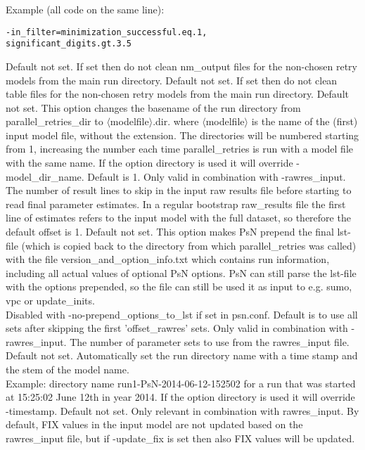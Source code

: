 \begin{optionlist}
Example (all code on the same line):
\begin{verbatim}
-in_filter=minimization_successful.eq.1,
significant_digits.gt.3.5
\end{verbatim}
\nextopt
{}
Default not set. If set then do not clean nm\_output files for the non-chosen retry models from the main run directory.
\nextopt
{}
Default not set. If set then do not clean table files for the non-chosen retry models from the main run directory.
\nextopt
{}
Default not set. This option changes the basename of the run directory from parallel\_retries\_dir to $\langle$modelfile$\rangle$.dir. where $\langle$modelfile$\rangle$ is the name of the (first) input model file, without the extension. The directories will be numbered starting from 1, increasing the number each time parallel\_retries is run with a model file with the same name. If the option directory is used it will override -model\_dir\_name.
\nextopt
{}
Default is 1. Only valid in combination with -rawres\_input. The number of result lines to skip in the input raw results file before starting to read final parameter estimates. In a regular bootstrap raw\_results file the first line of estimates refers to the input model with the full dataset, so therefore the default offset is 1.
\nextopt
{}
Default not set. This option makes PsN prepend the final lst-file (which is copied back to the directory from which parallel\_retries was called) with the file version\_and\_option\_info.txt which contains run information, including all actual values of optional PsN options. PsN can still parse the lst-file with the options prepended, so the file can still be used it as input to e.g. sumo, vpc or update\_inits.\\ Disabled with -no-prepend\_options\_to\_lst if set in psn.conf.
\nextopt
{}
Default is to use all sets after skipping the first 'offset\_rawres' sets. Only valid in combination with -rawres\_input. The number of parameter sets to use from the rawres\_input file. 
\nextopt
{}
Default not set. Automatically set the run directory name with a time stamp and the stem of the model name.\\
Example: directory name run1-PsN-2014-06-12-152502 for a run that was started at 15:25:02 June 12th in year 2014. If the option directory is used it will override -timestamp.
\nextopt
{}
Default not set. Only relevant in combination with rawres\_input. By default, FIX values in the input model are not updated based on the rawres\_input file, but if -update\_fix is set then also FIX values will be updated.
\nextopt
\end{optionlist}

